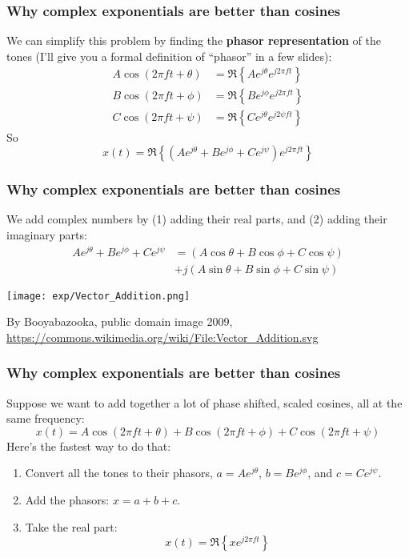 \documentclass{beamer}
\begin{document}
\begin{frame}
  \frametitle{Why complex exponentials are better than cosines}

  We can simplify this problem by finding the {\bf phasor
    representation} of the tones (I'll give you a formal definition of
  ``phasor'' in a few slides):
  \begin{align*}
    A\cos\left(2\pi ft+\theta\right) &= \Re\left\{Ae^{j\theta}e^{j2\pi ft}\right\}\\
    B\cos\left(2\pi ft+\phi\right) &= \Re\left\{Be^{j\phi}e^{j2\pi ft}\right\}\\
    C\cos\left(2\pi ft+\psi\right) &= \Re\left\{Ce^{j\theta}e^{j2\psi ft}\right\}
  \end{align*}
  So
  \[
  x(t) = \Re\left\{\left(Ae^{j\theta}+Be^{j\phi}+Ce^{j\psi}\right)e^{j2\pi ft}\right\}
  \]
\end{frame}

\begin{frame}
  \frametitle{Why complex exponentials are better than cosines}

  We add complex numbers by (1) adding their real parts, and (2)
  adding their imaginary parts:
  \begin{align*}
    Ae^{j\theta}+Be^{j\phi}+Ce^{j\psi} &= (A\cos\theta+B\cos\phi+C\cos\psi)\\
    &+j(A\sin\theta+B\sin\phi+C\sin\psi)
  \end{align*}
  \centerline{\texttt{[image: exp/Vector\_Addition.png]}}
  \begin{tiny}
    By Booyabazooka, public domain image 2009,
    \url{https://commons.wikimedia.org/wiki/File:Vector_Addition.svg}
  \end{tiny}
\end{frame}


\begin{frame}
  \frametitle{Why complex exponentials are better than cosines}

  Suppose we want to add together a lot of phase shifted, scaled
  cosines, all at the same frequency:
  \[
  x(t) = A\cos\left(2\pi ft+\theta\right)+B\cos\left(2\pi ft+\phi\right)+C\cos\left(2\pi ft+\psi\right)
  \]
  Here's the fastest way to do that:
  \begin{enumerate}
  \item Convert all the tones to their phasors, $a=Ae^{j\theta}$,
    $b=Be^{j\phi}$, and $c=Ce^{j\psi}$.
  \item Add the phasors: $x=a+b+c$.
  \item Take the real part:
    \[x(t) = \Re\left\{xe^{j2\pi ft}\right\}
    \]
  \end{enumerate}
\end{frame}
\end{document}
